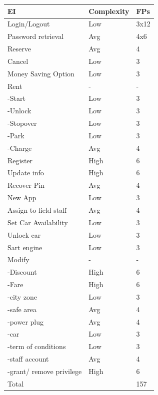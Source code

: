 \documentclass[english]{article}
\newenvironment{fpcounttable}[1]{
	\begin{center}
	\begin{longtable}{|l|l|l|}
	\hline 
	#1 & Complexity & FPs \\\hline
}{
	\end{longtable}\end{center}
}
\newcommand{\fptotal}[1]{
	\multicolumn{2}{|l|}{{Total}}
	& #1\\\hline
}
\newcommand{\eih}{ & High & 6}
\newcommand{\eia}{ &Avg & 4}
\newcommand{\eil}{ & Low & 3}
\begin{document}
\begin{fpcounttable}{EI}
Login/Logout \eil x12 \\
Password retrieval \eia x6 \\
Reserve \eia \\
Cancel \eil \\
Money Saving Option \eil \\
Rent& - & - \\
-Start \eil\\
-Unlock \eil\\
-Stopover \eil\\
-Park \eil\\
-Charge \eia\\
Register \eih\\
Update info \eih\\
Recover Pin \eia\\
New App \eil\\
Assign to field staff \eia\\
Set Car Availability \eil\\
Unlock car\eil\\
Sart engine\eil\\
Modify &-&-\\
-Discount \eih\\
-Fare \eih\\
-city zone \eil\\
-safe area \eia\\
-power plug\eia\\
-car\eil\\
-term of conditions\eil \\
-staff account\eia\\
-grant/ remove privilege\eih\\\hline 

\fptotal{157}	
\end{fpcounttable}
\end{document}
